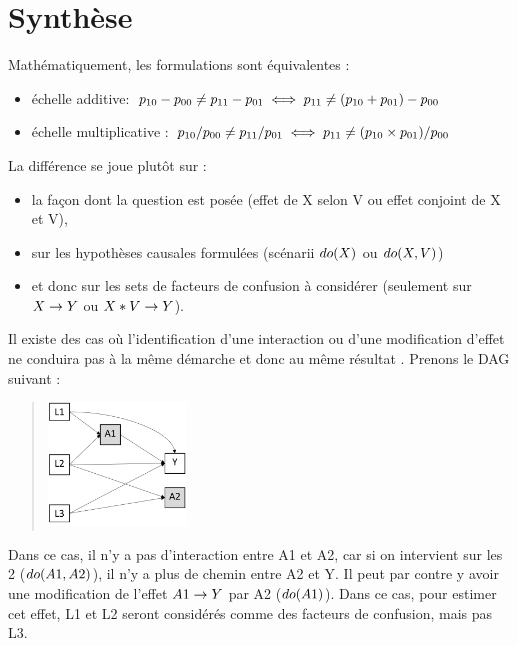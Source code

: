 \documentclass[
]{book}
\providecommand{\tightlist}{%
  \setlength{\itemsep}{0pt}\setlength{\parskip}{0pt}}
\begin{document}
\hypertarget{synthuxe8se}{%
\section{Synthèse}\label{synthuxe8se}}

Mathématiquement, les formulations sont équivalentes :

\begin{itemize}
\tightlist
\item
  échelle additive: \(\small p_{10} -p_{00} \neq p_{11}- p_{01} \iff p_{11} \neq (p_{10}+p_{01})- p_{00}\)
\item
  échelle multiplicative : \(\small p_{10} /p_{00} \neq p_{11}/ p_{01} \iff p_{11} \neq (p_{10} \times p_{01})/p_{00}\)
\end{itemize}

La différence se joue plutôt sur :

\begin{itemize}
\tightlist
\item
  la façon dont la question est posée (effet de X selon V ou effet conjoint de X et V),
\item
  sur les hypothèses causales formulées (scénarii \(\small do(X)\) ou \(\small do(X,V)\))
\item
  et donc sur les sets de facteurs de confusion à considérer (seulement sur \(\small X \rightarrow Y\) ou \(\small X*V \rightarrow Y\)).
\end{itemize}

Il existe des cas où l'identification d'une interaction ou d'une modification d'effet ne conduira pas à la même démarche et donc au même résultat \citet{vanderweele_distinction_2009}. Prenons le DAG suivant :

\begin{quote}
\includegraphics[width=0.3\textwidth,height=\textheight]{img/Image12.png}
\end{quote}

Dans ce cas, il n'y a pas d'interaction entre A1 et A2, car si on intervient sur les 2 (\(\small do(A1, A2)\)), il n'y a plus de chemin entre A2 et Y. Il peut par contre y avoir une modification de l'effet \(\small A1 \rightarrow Y\) par A2 (\(\small do(A1)\)). Dans ce cas, pour estimer cet effet, L1 et L2 seront considérés comme des facteurs de confusion, mais pas L3.
\end{document}
